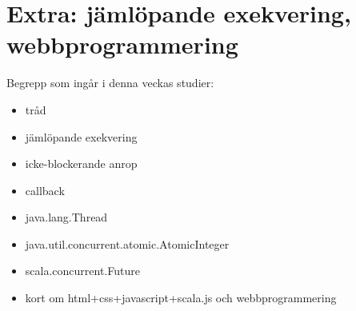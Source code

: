 \chapter{Extra: jämlöpande exekvering, webbprogrammering}\label{chapter:W14}
Begrepp som ingår i denna veckas studier:
\begin{itemize}[noitemsep,label={$\square$},leftmargin=*]
\item tråd
\item jämlöpande exekvering
\item icke-blockerande anrop
\item callback
\item java.lang.Thread
\item java.util.concurrent.atomic.AtomicInteger
\item scala.concurrent.Future
\item kort om html+css+javascript+scala.js och webbprogrammering\end{itemize}
